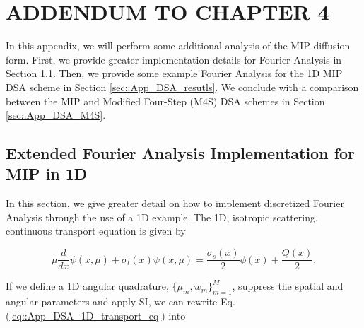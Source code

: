 %
%
%


\chapter{\uppercase {Addendum to Chapter 4}}
\label{sec::appendix_DSA}

In this appendix, we will perform some additional analysis of the MIP diffusion form. First, we provide greater implementation details for Fourier Analysis in Section \ref{sec::App_DSA_fourier}. Then, we provide some example Fourier Analysis for the 1D MIP DSA scheme in Section \ref{sec::App_DSA_resutls}. We conclude with a comparison between the MIP and Modified Four-Step (M4S) DSA schemes in Section \ref{sec::App_DSA_M4S}.

\section{Extended Fourier Analysis Implementation for MIP in 1D}
\label{sec::App_DSA_fourier}

In this section, we give greater detail on how to implement discretized Fourier Analysis through the use of a 1D example. The 1D, isotropic scattering, continuous transport equation is given by

\begin{equation}
\label{eq::App_DSA_1D_transport_eq}
\mu \frac{d }{d x} \psi (x,\mu) + \sigma_t (x) \psi(x,\mu) = \frac{\sigma_s (x)}{2} \phi(x) + \frac{Q(x)}{2}.
\end{equation}

\noindent If we define a 1D angular quadrature, $\{  \mu_m, w_m \}_{m=1}^M$, suppress the spatial and angular parameters and apply SI, we can rewrite Eq. (\ref{eq::App_DSA_1D_transport_eq}) into

